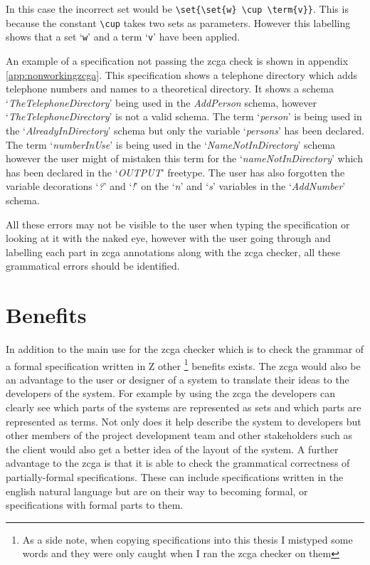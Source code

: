 In this case the incorrect set would be \verb|\set{\set{w} \cup \term{v}}|. This
is because the constant \verb|\cup| takes two sets as parameters. However this
labelling shows that a set `\verb|w|' and a term `\verb|v|' have been applied. 

An example of a specification not passing the \gls{zcga} check is shown in
appendix \ref{app:nonworkingzcga}. This specification shows a telephone directory
which adds telephone numbers and names to a theoretical directory. It shows a
schema `\emph{TheTelephoneDirectory}' being used in the \emph{AddPerson}
schema, however `\emph{TheTelephoneDirectory}' is not a valid schema. The term
`\emph{person}' is being used in the `\emph{AlreadyInDirectory}' schema but only
the variable `\emph{persons}' has been declared. The term `\emph{numberInUse}'
is being used in the `\emph{NameNotInDirectory}' schema however the user might
of mistaken this term for the `\emph{nameNotInDirectory}' which has been
declared in the `\emph{OUTPUT}' freetype. The user has also forgotten the
variable decorations `\emph{?}' and `\emph{!}' on the `\emph{n}' and `\emph{s}'
variables in the `\emph{AddNumber}' schema.

All these errors may not be visible to the user when typing the specification or
looking at it with the naked eye, however with the user going through and
labelling each part in \gls{zcga} annotations along with the \gls{zcga} checker,
all these grammatical errors should be identified.


\section{Benefits}

In addition to the main use for the \gls{zcga} checker which is to check the
grammar of a formal specification written in Z other \footnote{As a side note,
when copying specifications into this thesis I mistyped some words and they were
only caught when I ran the \gls{zcga} checker on them} benefits exists. The
\gls{zcga} would also be an advantage to the user or designer of a system to
translate their ideas to the developers of the system. For example by using the
\gls{zcga} the developers can clearly see which parts of the systems are
represented as sets and which parts are represented as terms. Not only does it
help describe the system to developers but other members of the project
development team and other stakeholders such as the client would also get a
better idea of the layout of the system. A further advantage to the \gls{zcga}
is that it is able to check the grammatical correctness of partially-formal
specifications. These can include specifications written in the english natural
language but are on their way to becoming formal, or specifications with formal
parts to them.

